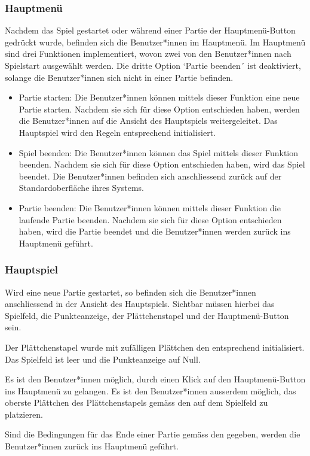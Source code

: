 \documentclass[../main.tex]{subfiles}
\begin{document}
	\subsubsection{Hauptmenü}
	\par Nachdem das Spiel gestartet oder während einer Partie der Hauptmenü-Button gedrückt wurde, befinden sich die Benutzer*innen im Hauptmenü. Im Hauptmenü sind drei Funktionen implementiert, wovon zwei von den Benutzer*innen nach Spielstart ausgewählt werden. Die dritte Option `Partie beenden´ ist deaktiviert, solange die Benutzer*innen sich nicht in einer Partie befinden.
	\begin{itemize}
		\item Partie starten: Die Benutzer*innen können mittels dieser Funktion eine neue Partie starten. Nachdem sie sich für diese Option entschieden haben, werden die Benutzer*innen auf die Ansicht des Hauptspiels weitergeleitet. Das Hauptspiel wird den Regeln entsprechend initialisiert.
		\item Spiel beenden: Die Benutzer*innen können das Spiel mittels dieser Funktion beenden. Nachdem sie sich für diese Option entschieden haben, wird das Spiel beendet. Die Benutzer*innen befinden sich anschliessend zurück auf der Standardoberfläche ihres Systems.
		\item Partie beenden: Die Benutzer*innen können mittels dieser Funktion die laufende Partie beenden. Nachdem sie sich für diese Option entschieden haben, wird die Partie beendet und die Benutzer*innen werden zurück ins Hauptmenü geführt.
	\end{itemize}

	\subsubsection{Hauptspiel}
	\par Wird eine neue Partie gestartet, so befinden sich die Benutzer*innen anschliessend in der Ansicht des Hauptspiels. Sichtbar müssen hierbei das Spielfeld, die Punkteanzeige, der Plättchenstapel und der Hauptmenü-Button sein.
	\par Der Plättchenstapel wurde mit zufälligen Plättchen den  entsprechend initialisiert. Das Spielfeld ist leer und die Punkteanzeige auf Null.
	\par Es ist den Benutzer*innen möglich, durch einen Klick auf den Hauptmenü-Button ins Hauptmenü zu gelangen. Es ist den Benutzer*innen ausserdem möglich, das oberste Plättchen des Plättchenstapels gemäss den  auf dem Spielfeld zu platzieren.
	\par Sind die Bedingungen für das Ende einer Partie gemäss den  gegeben, werden die Benutzer*innen zurück ins Hauptmenü geführt.
	
\end{document}
